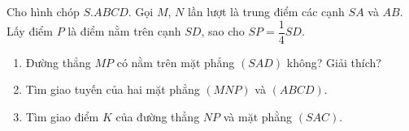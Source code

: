 \begin{bt}
\begin{bt}%
    Cho hình chóp $S.ABCD$. Gọi $M$, $N$ lần lượt là trung điểm các cạnh $SA$ và $AB$. Lấy điểm $P$ là điểm nằm trên cạnh $SD$, sao cho $SP=\dfrac{1}{4}SD$.
    \begin{enumerate}
        \item Đường thẳng $MP$ có nằm trên mặt phẳng $(SAD)$ không? Giải thích?
        \item Tìm giao tuyến của hai mặt phẳng $(MNP)$ và $(ABCD)$.
        \item Tìm giao điểm $K$ của đường thẳng $NP$ và mặt phằng $(SAC)$.
    \end{enumerate}
    

\end{bt}
\end{bt}
